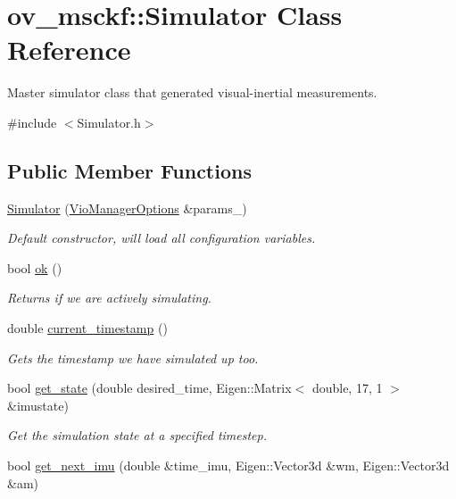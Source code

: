 \hypertarget{classov__msckf_1_1Simulator}{}\section{ov\+\_\+msckf\+:\+:Simulator Class Reference}
\label{classov__msckf_1_1Simulator}


Master simulator class that generated visual-\/inertial measurements.  




{\ttfamily \#include $<$Simulator.\+h$>$}

\subsection*{Public Member Functions}
\begin{DoxyCompactItemize}
\item 
\hyperlink{classov__msckf_1_1Simulator_ab36fe774609d9e764219266867e21c4d}{Simulator} (\hyperlink{structov__msckf_1_1VioManagerOptions}{Vio\+Manager\+Options} \&params\+\_\+)
\begin{DoxyCompactList}\small\item\em Default constructor, will load all configuration variables. \end{DoxyCompactList}\item 
bool \hyperlink{classov__msckf_1_1Simulator_a23596249c56e31c4a74567b4f4601a7c}{ok} ()
\begin{DoxyCompactList}\small\item\em Returns if we are actively simulating. \end{DoxyCompactList}\item 
double \hyperlink{classov__msckf_1_1Simulator_a10fbc2c949b380e152a3b9097b5b6643}{current\+\_\+timestamp} ()
\begin{DoxyCompactList}\small\item\em Gets the timestamp we have simulated up too. \end{DoxyCompactList}\item 
bool \hyperlink{classov__msckf_1_1Simulator_a3ccf4a1249f70725edad1f9f4e80f9e9}{get\+\_\+state} (double desired\+\_\+time, Eigen\+::\+Matrix$<$ double, 17, 1 $>$ \&imustate)
\begin{DoxyCompactList}\small\item\em Get the simulation state at a specified timestep. \end{DoxyCompactList}\item 
bool \hyperlink{classov__msckf_1_1Simulator_a1a5c6dd7e892a8948d3c2d2a3824fb39}{get\+\_\+next\+\_\+imu} (double \&time\+\_\+imu, Eigen\+::\+Vector3d \&wm, Eigen\+::\+Vector3d \&am)

\end{DoxyCompactItemize}
